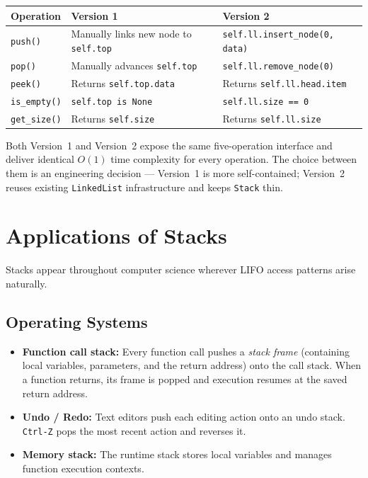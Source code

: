 \documentclass[11pt, a4paper, notitlepage]{report}
\theoremstyle{definition}
\theoremstyle{remark}
\theoremstyle{definition}
\begin{document}
\begin{center}
\begin{tabularx}{\linewidth}{lXX}
\toprule
\textbf{Operation} & \textbf{Version 1} & \textbf{Version 2} \\
\midrule
\texttt{push()} & Manually links new node to \texttt{self.top} &
                  \texttt{self.ll.insert\_node(0, data)} \\
\texttt{pop()} & Manually advances \texttt{self.top} &
                 \texttt{self.ll.remove\_node(0)} \\
\texttt{peek()} & Returns \texttt{self.top.data} &
                  Returns \texttt{self.ll.head.item} \\
\texttt{is\_empty()} & \texttt{self.top is None} &
                        \texttt{self.ll.size == 0} \\
\texttt{get\_size()} & Returns \texttt{self.size} &
                        Returns \texttt{self.ll.size} \\
\bottomrule
\end{tabularx}
\end{center}

\begin{keyresult}[title={Key Result: Two Valid Implementations}]
Both Version~1 and Version~2 expose the same five-operation interface and deliver
identical $O(1)$ time complexity for every operation. The choice between them is
an engineering decision --- Version~1 is more self-contained; Version~2 reuses
existing \texttt{LinkedList} infrastructure and keeps \texttt{Stack} thin.
\end{keyresult}

\section{Applications of Stacks}
\label{sec:stack-apps}

Stacks appear throughout computer science wherever LIFO access patterns arise naturally.

\subsection{Operating Systems}
\label{subsec:stack-os}

\begin{itemize}
  \item \textbf{Function call stack:} Every function call pushes a \emph{stack frame}
        (containing local variables, parameters, and the return address) onto the
        call stack. When a function returns, its frame is popped and execution resumes
        at the saved return address.
  \item \textbf{Undo / Redo:} Text editors push each editing action onto an undo stack.
        \texttt{Ctrl-Z} pops the most recent action and reverses it.
  \item \textbf{Memory stack:} The runtime stack stores local variables and manages
        function execution contexts.
\end{itemize}
\end{document}
